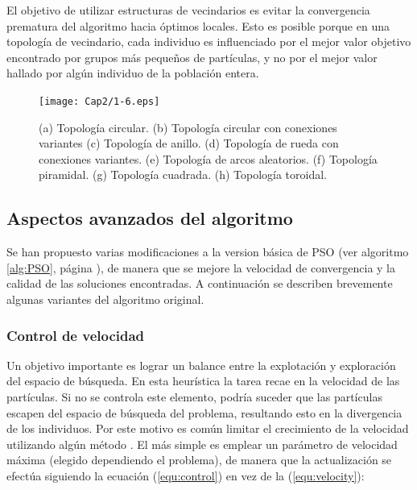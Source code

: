   El objetivo de utilizar estructuras de vecindarios es evitar la convergencia prematura del algoritmo hacia \'optimos locales. Esto es posible 
  porque en una topolog\'ia de vecindario, cada individuo es influenciado por el mejor valor objetivo encontrado por grupos m\'as peque\~nos de 
  part\'iculas, y no por el mejor valor hallado por alg\'un individuo de la poblaci\'on entera.
   
    \begin{figure}
	\centering
	\texttt{[image: Cap2/1-6.eps]}
	  \caption [Topolog\'ias de Vecindarios]{ (a) Topolog\'ia circular. (b) Topolog\'ia circular con conexiones variantes (c) Topolog\'ia de anillo. (d) Topolog\'ia
	  de rueda con conexiones variantes. (e) Topolog\'ia de arcos aleatorios. (f) Topolog\'ia piramidal. (g) Topolog\'ia cuadrada. 
	  (h) Topolog\'ia toroidal.}
      \label{fig:vecindarios}
      \end{figure}
    
    \subsection{Aspectos avanzados del algoritmo}
    
    Se han propuesto varias modificaciones a la version b\'asica de PSO (ver algoritmo \ref{alg:PSO}, p\'agina \pageref{alg:PSO}), de 
    manera que se mejore la velocidad de convergencia y la calidad de las soluciones encontradas. A continuaci\'on se describen brevemente 
    algunas variantes del algoritmo original.
    
    \subsubsection{Control de velocidad}
    
    Un objetivo importante es lograr un balance entre la explotaci\'on y exploraci\'on del espacio de b\'usqueda. En esta heur\'istica 
    la tarea recae en la velocidad de las part\'iculas. Si no se controla este elemento, podr\'ia suceder que las part\'iculas escapen 
    del espacio de b\'usqueda del problema, resultando esto en la divergencia de los individuos. Por este motivo es com\'un limitar el 
    crecimiento de la velocidad utilizando alg\'un m\'etodo \cite{Eberhart1996}. El m\'as simple es emplear un par\'ametro de velocidad m\'axima (elegido
    dependiendo el problema), de manera que la actualizaci\'on se efect\'ua  siguiendo la ecuaci\'on (\ref{equ:control}) en vez de la 
    (\ref{equ:velocity}):
    
